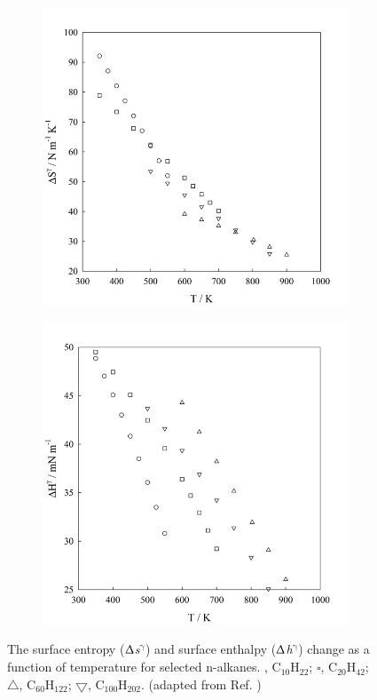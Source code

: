 \documentclass[9pt,bestpractices]{livecoms}
\begin{document}
\begin{figure}
	\centering
	\begin{subfigure}{0.9\linewidth} %
    \includegraphics[width=1\textwidth]{gfx/image68.jpeg}
	\end{subfigure}
	\begin{subfigure}{0.9\linewidth} %
    \includegraphics[width=1\textwidth]{gfx/image69.jpeg}
	\end{subfigure}
\caption{The surface entropy (${\Updelta}$\textit{s}$^{\mathrm{{\gamma}}}$)
and surface enthalpy (${\Updelta}$\textit{h}$^{\mathrm{{\gamma}}}$) change as
a function of temperature for selected n-alkanes. \textbigcircle, C$_{10}$H$_{22}$;
${\square}$, C$_{20}$H$_{42}$; ${\bigtriangleup}$, C$_{60}$H$_{122}$;
${\bigtriangledown}$, C$_{100}$H$_{202}$. (adapted from Ref. \citep{muller2011})}
\label{fig:22}
\end{figure}
\end{document}
